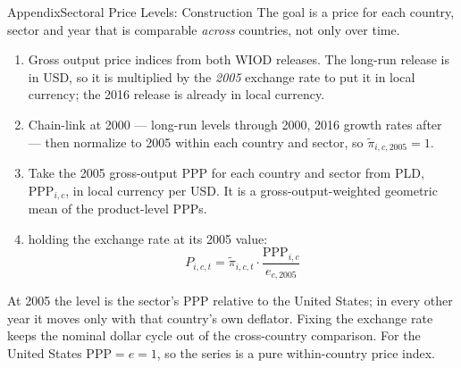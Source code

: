\documentclass[10pt]{beamer}
\newcommand{\apback}[1]{%
  \vfill\raggedleft\hyperlink{#1}{\structure{\tiny$\blacktriangleleft$\,back}}}
\begin{document}
\begin{frame}{Appendix}{Sectoral Price Levels: Construction}\label{ap:prices}
  \footnotesize
  The goal is a price for each country, sector and year that is comparable
  \emph{across} countries, not only over time.
  \begin{enumerate}\itemsep2pt
    \item {} Gross output price indices from both WIOD releases.
          The long-run release is in USD, so it is multiplied by the
          \emph{2005} exchange rate to put it in local currency; the 2016
          release is already in local currency.
    \item {} Chain-link at 2000 --- long-run levels through 2000,
          2016 growth rates after --- then normalize to 2005 within each
          country and sector, so $\tilde{\pi}_{i,c,2005}=1$.
    \item {} Take the 2005 gross-output PPP for each country
          and sector from PLD, $\text{PPP}_{i,c}$, in local currency per USD.
          It is a gross-output-weighted geometric mean of the product-level PPPs.
    \item {} holding the exchange rate at its 2005 value:
      \begin{equation*}
        P_{i,c,t} = \tilde{\pi}_{i,c,t}\cdot\frac{\text{PPP}_{i,c}}{e_{c,2005}}
      \end{equation*}
  \end{enumerate}
  At 2005 the level is the sector's PPP relative to the United States; in every
  other year it moves only with that country's own deflator. Fixing the exchange
  rate keeps the nominal dollar cycle out of the cross-country comparison. For
  the United States $\text{PPP}=e=1$, so the series is a pure within-country
  price index.
  \apback{fr:data}
\end{frame}
\end{document}
